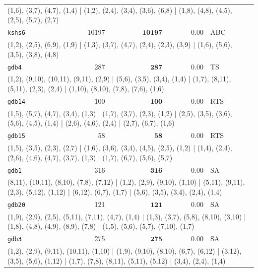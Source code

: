\begin{longtable}{lrrrl}
\multicolumn{5}{p{0.96\linewidth}}{\tiny\raggedright\arraybackslash (1,6), (3,7), (4,7), (1,4) | (1,2), (2,4), (3,4), (3,6), (6,8) | (1,8), (4,8), (4,5), (2,5), (5,7), (2,7)} \\[2pt]
\texttt{kshs6} & 10197 & $\mathbf{10197}$ & 0.00 & ABC \\
\multicolumn{5}{p{0.96\linewidth}}{\tiny\raggedright\arraybackslash (1,2), (2,5), (6,9), (1,9) | (1,3), (3,7), (4,7), (2,4), (2,3), (3,9) | (1,6), (5,6), (3,5), (3,8), (4,8)} \\[2pt]
\texttt{gdb4} & 287 & $\mathbf{287}$ & 0.00 & TS \\
\multicolumn{5}{p{0.96\linewidth}}{\tiny\raggedright\arraybackslash (1,2), (9,10), (10,11), (9,11), (2,9) | (5,6), (3,5), (3,4), (1,4) | (1,7), (8,11), (5,11), (2,3), (2,4) | (1,10), (8,10), (7,8), (7,6), (1,6)} \\[2pt]
\texttt{gdb14} & 100 & $\mathbf{100}$ & 0.00 & RTS \\
\multicolumn{5}{p{0.96\linewidth}}{\tiny\raggedright\arraybackslash (1,5), (5,7), (4,7), (3,4), (1,3) | (1,7), (3,7), (2,3), (1,2) | (2,5), (3,5), (3,6), (5,6), (4,5), (1,4) | (2,6), (4,6), (2,4) | (2,7), (6,7), (1,6)} \\[2pt]
\texttt{gdb15} & 58 & $\mathbf{58}$ & 0.00 & RTS \\
\multicolumn{5}{p{0.96\linewidth}}{\tiny\raggedright\arraybackslash (1,5), (3,5), (2,3), (2,7) | (1,6), (3,6), (3,4), (4,5), (2,5), (1,2) | (1,4), (2,4), (2,6), (4,6), (4,7), (3,7), (1,3) | (1,7), (6,7), (5,6), (5,7)} \\[2pt]
\texttt{gdb1} & 316 & $\mathbf{316}$ & 0.00 & SA \\
\multicolumn{5}{p{0.96\linewidth}}{\tiny\raggedright\arraybackslash (8,11), (10,11), (8,10), (7,8), (7,12) | (1,2), (2,9), (9,10), (1,10) | (5,11), (9,11), (2,3), (5,12), (1,12) | (6,12), (6,7), (1,7) | (5,6), (3,5), (3,4), (2,4), (1,4)} \\[2pt]
\texttt{gdb20} & 121 & $\mathbf{121}$ & 0.00 & SA \\
\multicolumn{5}{p{0.96\linewidth}}{\tiny\raggedright\arraybackslash (1,9), (2,9), (2,5), (5,11), (7,11), (4,7), (1,4) | (1,3), (3,7), (5,8), (8,10), (3,10) | (1,8), (4,8), (4,9), (8,9), (7,8) | (1,5), (5,6), (5,7), (7,10), (1,7)} \\[2pt]
\texttt{gdb3} & 275 & $\mathbf{275}$ & 0.00 & SA \\
\multicolumn{5}{p{0.96\linewidth}}{\tiny\raggedright\arraybackslash (1,2), (2,9), (9,11), (10,11), (1,10) | (1,9), (9,10), (8,10), (6,7), (6,12) | (3,12), (3,5), (5,6), (1,12) | (1,7), (7,8), (8,11), (5,11), (5,12) | (3,4), (2,4), (1,4)} \\[2pt]

\end{longtable}
